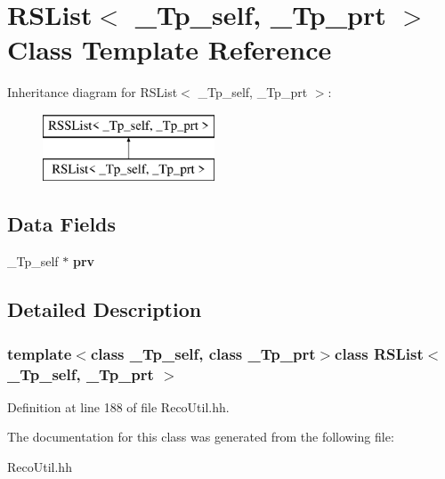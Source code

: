 \section{R\-S\-List$<$ \-\_\-\-Tp\-\_\-self, \-\_\-\-Tp\-\_\-prt $>$ Class Template Reference}
\label{classRSList}
Inheritance diagram for R\-S\-List$<$ \-\_\-\-Tp\-\_\-self, \-\_\-\-Tp\-\_\-prt $>$\-:\begin{figure}[H]
\begin{center}
\leavevmode
\includegraphics[height=2.000000cm]{classRSList}
\end{center}
\end{figure}
\subsection*{Data Fields}
\begin{DoxyCompactItemize}
\item 
\-\_\-\-Tp\-\_\-self $\ast$ {\bfseries prv}\label{classRSList_acb26209a58ad251d0c451985f6f612dd}

\end{DoxyCompactItemize}


\subsection{Detailed Description}
\subsubsection*{template$<$class \-\_\-\-Tp\-\_\-self, class \-\_\-\-Tp\-\_\-prt$>$class R\-S\-List$<$ \-\_\-\-Tp\-\_\-self, \-\_\-\-Tp\-\_\-prt $>$}



Definition at line 188 of file Reco\-Util.\-hh.



The documentation for this class was generated from the following file\-:\begin{DoxyCompactItemize}
\item 
Reco\-Util.\-hh\end{DoxyCompactItemize}
